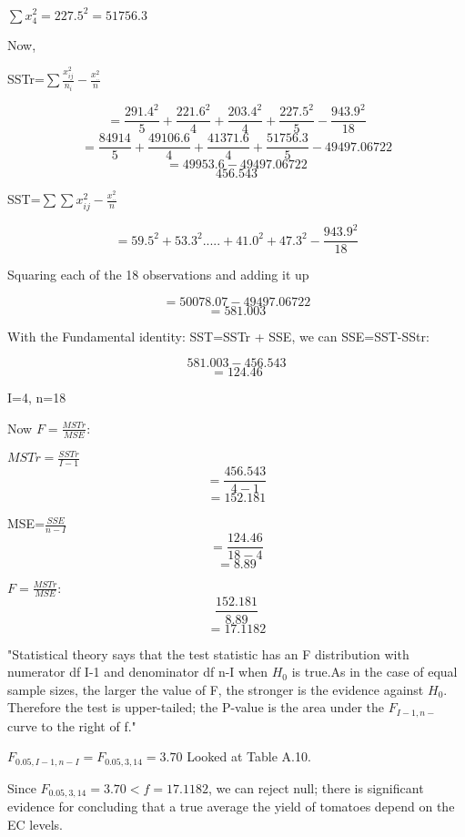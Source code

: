 \documentclass{article}
\begin{document}
$\sum x^{2}_{4}=227.5^{2}=51756.3$

\vspace{4mm}


Now,

\vspace{2mm}

SSTr=$\sum\frac{x^{2}_{ij}}{n_{i}}-\frac{x_{..}^{2}}{n}$

\vspace{2mm}


$$=\frac{291.4^{2}}{5}+\frac{221.6^{2}}{4}+\frac{203.4^{2}}{4}+\frac{227.5^{2}}{5}-\frac{943.9^{2}}{18}$$
$$=\frac{84914}{5}+\frac{49106.6}{4}+\frac{41371.6}{4}+\frac{51756.3}{5}-49497.06722$$
$$=49953.6-49497.06722$$
$$456.543$$



SST=$\sum \sum x^{2}_{ij}-\frac{x^{2}_{..}}{n}$

$$=59.5^{2}+53.3^{2}.....+41.0^{2} + 47.3^{2}-\frac{943.9^{2}}{18}$$


Squaring each of the 18 observations and adding it up

$$=50078.07-49497.06722$$
$$=581.003$$


With the Fundamental identity: SST=SSTr + SSE, we can SSE=SST-SStr:

$$581.003-456.543$$
$$=124.46$$

I=4, n=18

Now $F=\frac{MSTr}{MSE}:$

$MSTr=\frac{SSTr}{I-1}$
$$=\frac{456.543}{4-1}$$
$$=152.181$$

MSE=$\frac{SSE}{n-I}$
$$=\frac{124.46}{18-4}$$
$$=8.89$$

$F=\frac{MSTr}{MSE}:$
$$\frac{152.181}{8.89}$$
$$=17.1182$$

\vspace{2mm}


"Statistical theory says that the test statistic has an F distribution with numerator df I-1 and denominator df n-I when $H_{0}$ is true.As in the case of equal sample sizes, the larger the value of F, the stronger is the evidence against $H_{0}$. Therefore the test is upper-tailed; the P-value is the area under the $F_{I-1, n-}$ curve to the right of f."


\vspace{2mm}

$F_{0.05, I-1, n-I}=F_{0.05, 3, 14}=3.70$ Looked at Table A.10.

\vspace{2mm}


Since $F_{0.05, 3, 14}=3.70 < f=17.1182$, we can reject null; there is significant evidence for concluding that a true average the yield of tomatoes depend on the EC levels.
\end{document}
